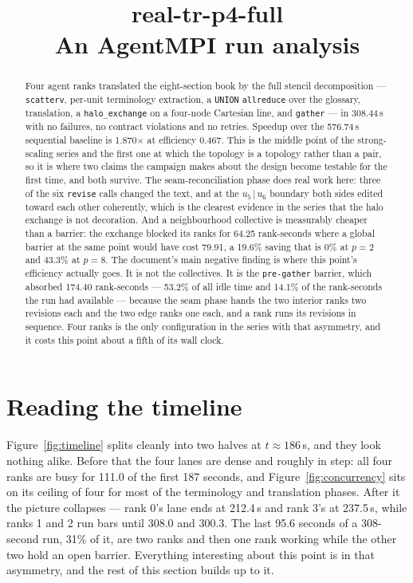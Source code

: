 \documentclass[11pt]{article}
\title{\textbf{real-tr-p4-full}\\[2pt]\large An AgentMPI run analysis}
\author{}
\date{}
\begin{document}
\maketitle

\begin{abstract}
Four agent ranks translated the eight-section book by the full stencil decomposition ---
\texttt{scatterv}, per-unit terminology extraction, a \texttt{UNION} \texttt{allreduce} over the
glossary, translation, a \texttt{halo\_exchange} on a four-node Cartesian line, and
\texttt{gather} --- in 308.44\,s with no failures, no contract violations and no retries. Speedup
over the 576.74\,s sequential baseline is 1.870$\times$ at efficiency 0.467. This is the middle
point of the strong-scaling series and the first one at which the topology is a topology rather
than a pair, so it is where two claims the campaign makes about the design become testable for
the first time, and both survive. The seam-reconciliation phase does real work here: three of the
six \texttt{revise} calls changed the text, and at the $u_5\,|\,u_6$ boundary both sides edited
toward each other coherently, which is the clearest evidence in the series that the halo exchange
is not decoration. And a neighbourhood collective is measurably cheaper than a barrier: the
exchange blocked its ranks for 64.25 rank-seconds where a global barrier at the same point would
have cost 79.91, a 19.6\% saving that is 0\% at $p=2$ and 43.3\% at $p=8$. The document's main
negative finding is where this point's efficiency actually goes. It is not the collectives. It is
the \texttt{pre-gather} barrier, which absorbed 174.40 rank-seconds --- 53.2\% of all idle time
and 14.1\% of the rank-seconds the run had available --- because the seam phase hands the two
interior ranks two revisions each and the two edge ranks one each, and a rank runs its revisions
in sequence. Four ranks is the only configuration in the series with that asymmetry, and it costs
this point about a fifth of its wall clock.
\end{abstract}



\section{Reading the timeline}

Figure~\ref{fig:timeline} splits cleanly into two halves at $t\approx186$\,s, and they look
nothing alike. Before that the four lanes are dense and roughly in step: all four ranks are busy
for 111.0 of the first 187 seconds, and Figure~\ref{fig:concurrency} sits on its ceiling of four
for most of the terminology and translation phases. After it the picture collapses --- rank 0's
lane ends at 212.4\,s and rank 3's at 237.5\,s, while ranks 1 and 2 run bars until 308.0 and
300.3. The last 95.6 seconds of a 308-second run, 31\% of it, are two ranks and then one rank
working while the other two hold an open barrier. Everything interesting about this point is in
that asymmetry, and the rest of this section builds up to it.
\end{document}
